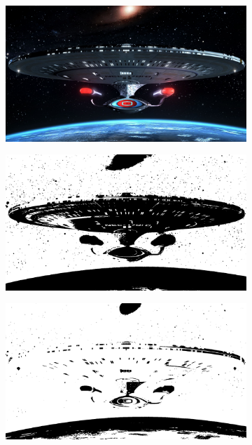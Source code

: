 \documentclass{article}
\begin{document}
\begin{figure}[H]
\begin{subfigure}{.3\textwidth}
  \centering
  \includegraphics[width=0.97\linewidth]{_Figures/sample_3.jpg}
  \caption{}
  \label{fig:tresh_raw_3}
\end{subfigure}%
\begin{subfigure}{.3\textwidth}
  \centering
  \includegraphics[width=0.97\linewidth]{_Figures/sample_3_good_treshold.png}
  \caption{}
  \label{fig:tresh_good_3}
\end{subfigure}%
\begin{subfigure}{.3\textwidth}
  \centering
  \includegraphics[width=0.97\linewidth]{_Figures/sample_3_bad_treshold.png}
    \caption{}
  \label{fig:tresh_bad_3}
\end{subfigure}


\end{figure}
\end{document}

